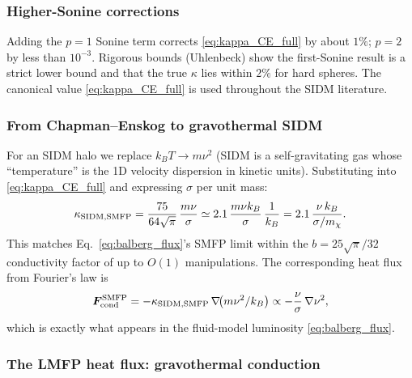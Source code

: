 \documentclass[12pt]{article}
\renewcommand{\vec}[1]{\bm{#1}}
\newcommand{\smx}{\sigma/m_\chi}
\begin{document}
\subsubsection{Higher-Sonine corrections}

Adding the $p=1$ Sonine term corrects \eqref{eq:kappa_CE_full} by
about $1\%$; $p=2$ by less than $10^{-3}$.  Rigorous bounds
(Uhlenbeck) show the first-Sonine result is a strict lower bound and
that the true $\kappa$ lies within $2\%$ for hard spheres.  The
canonical value \eqref{eq:kappa_CE_full} is used throughout the SIDM
literature.

\subsubsection{From Chapman--Enskog to gravothermal SIDM}

For an SIDM halo we replace $k_B T \to m\nu^2$ (SIDM is a
self-gravitating gas whose ``temperature'' is the 1D velocity
dispersion in kinetic units).  Substituting into
\eqref{eq:kappa_CE_full} and expressing $\sigma$ per unit mass:
%
\begin{equation}
  \kappa_{\rm SIDM,SMFP}
    = \frac{75}{64\sqrt\pi}\,\frac{m\nu}{\sigma}
    \simeq 2.1\,\frac{m\nu k_B}{\sigma}\,\frac{1}{k_B}
    = 2.1\,\frac{\nu\,k_B}{\smx}.
  \label{eq:kappa_SIDM_SMFP}
\end{equation}
%
This matches Eq.~\eqref{eq:balberg_flux}'s SMFP limit within the
$b = 25\sqrt\pi/32$ conductivity factor of \citet{Balberg2002} up to
$O(1)$ manipulations.  The corresponding heat flux from Fourier's law
is
%
\begin{equation}
  \vec F_{\rm cond}^{\rm SMFP}
   = -\kappa_{\rm SIDM,SMFP}\,\nabla\!\bigl(m\nu^2/k_B\bigr)
   \propto -\frac{\nu}{\sigma}\,\nabla\nu^2,
\end{equation}
%
which is exactly what appears in the fluid-model luminosity
\eqref{eq:balberg_flux}.

\subsubsection{The LMFP heat flux: gravothermal conduction}
\end{document}
